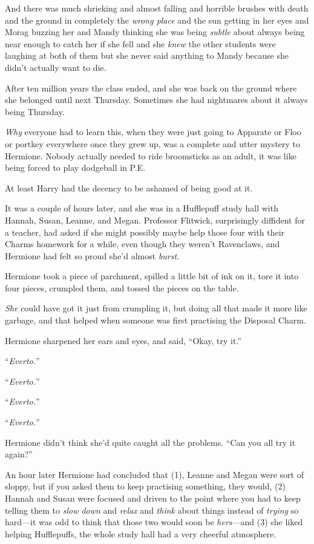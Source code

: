 And there was much shrieking and almost falling and horrible brushes with death and the ground in completely the \emph{wrong place} and the sun getting in her eyes and Morag buzzing her and Mandy thinking she was being \emph{subtle} about always being near enough to catch her if she fell and she \emph{knew} the other students were laughing at both of them but she never said anything to Mandy because she didn’t actually want to die.

After ten million years the class ended, and she was back on the ground where she belonged until next Thursday. Sometimes she had nightmares about it always being Thursday.

\emph{Why} everyone had to learn this, when they were just going to Apparate or Floo or portkey everywhere once they grew up, was a complete and utter mystery to Hermione. Nobody actually needed to ride broomsticks as an adult, it was like being forced to play dodgeball in P.E.

At least Harry had the decency to be ashamed of being good at it.

\later

It was a couple of hours later, and she was in a Hufflepuff study hall with Hannah, Susan, Leanne, and Megan. Professor Flitwick, surprisingly diffident for a teacher, had asked if she might possibly maybe help those four with their Charms homework for a while, even though they weren’t Ravenclaws, and Hermione had felt so proud she’d almost \emph{burst}.

Hermione took a piece of parchment, spilled a little bit of ink on it, tore it into four pieces, crumpled them, and tossed the pieces on the table.

\emph{She} could have got it just from crumpling it, but doing all that made it more like garbage, and that helped when someone was first practising the Disposal Charm.

Hermione sharpened her ears and eyes, and said,
“Okay, try it.”

“\emph{Everto.}”

“\emph{Everto.}”

“\emph{Everto.}”

“\emph{Everto.}”

Hermione didn’t think she’d quite caught all the problems.
“Can you all try it again?”

An hour later Hermione had concluded that (1), Leanne and Megan were sort of sloppy, but if you asked them to keep practising something, they would, (2) Hannah and Susan were focused and driven to the point where you had to keep telling them to \emph{slow down} and \emph{relax} and \emph{think} about things instead of \emph{trying} so hard—it was odd to think that those two would soon be \emph{hers}—and (3) she liked helping Hufflepuffs, the whole study hall had a very cheerful atmosphere.

